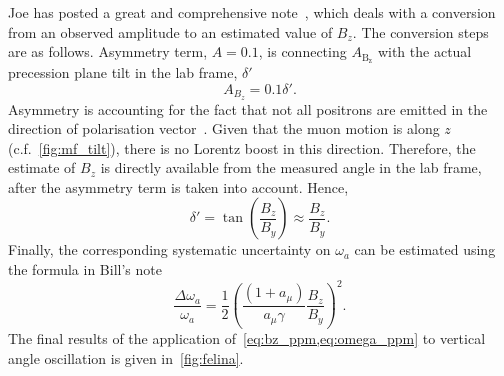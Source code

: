 \documentclass[12pt]{article}
\begin{document}
\clearpage
\thispagestyle{plain}
Joe has posted a great and comprehensive note~\cite{Joe_Gleb}, which deals with a conversion from an observed amplitude to an estimated value of $B_z$. The conversion steps are as follows. Asymmetry term, $A=0.1$, is connecting $A_{\mathrm{B_z}}$ with the actual precession plane tilt in the lab frame, $\delta '$
\begin{equation}
    A_{B_z}=0.1\delta '.
\end{equation}
Asymmetry is accounting for the fact that not all positrons are emitted in the direction of polarisation vector~\cite{Joe_Gleb}. Given that the muon motion is along $z$ (c.f.~\cref{fig:mf_tilt}), there is no Lorentz boost in this direction. Therefore, the estimate of $B_z$ is directly available from the measured angle in the lab frame, after the asymmetry term is taken into account. Hence, 
\begin{equation}
    \delta ' = \tan(\frac{B_z}{B_y})  \approx \frac{B_z}{B_y}.
    \label{eq:bz_ppm}
\end{equation}
Finally, the corresponding systematic uncertainty on $\omega_a$ can be estimated using the formula in Bill's note~\cite{Bill}
\begin{equation}
    \frac{\Delta \omega_a}{\omega_a} = \frac{1}{2}\left(\frac{(1+a_{\mu})}{a_{\mu}\gamma}\frac{B_z}{B_y}\right)^2.
    \label{eq:omega_ppm}
\end{equation}
The final results of the application of~\cref{eq:bz_ppm,eq:omega_ppm} to  vertical angle oscillation is given in~\cref{fig:felina}.

\clearpage
\thispagestyle{plain} 
\end{document}
